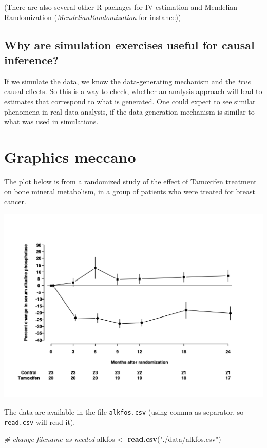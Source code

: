 \documentclass[
]{book}
\newenvironment{Shaded}{\begin{snugshade}}{\end{snugshade}}
\newcommand{\CommentTok}[1]{\textcolor[rgb]{0.56,0.35,0.01}{\textit{#1}}}
\newcommand{\FunctionTok}[1]{\textcolor[rgb]{0.13,0.29,0.53}{\textbf{#1}}}
\newcommand{\NormalTok}[1]{#1}
\newcommand{\OtherTok}[1]{\textcolor[rgb]{0.56,0.35,0.01}{#1}}
\newcommand{\StringTok}[1]{\textcolor[rgb]{0.31,0.60,0.02}{#1}}
\begin{document}
(There are also several other R packages for IV estimation and Mendelian Randomization (\emph{MendelianRandomization} for instance))

\section{Why are simulation exercises useful for causal inference?}\label{why-are-simulation-exercises-useful-for-causal-inference}

If we simulate the data, we know the data-generating mechanism and the \emph{true} causal effects. So this is a way to check, whether
an analysis approach will lead to estimates that correspond to what is generated. One could expect to see similar phenomena in real
data analysis, if the data-generation mechanism is similar to what was used in simulations.

\chapter{Graphics meccano}\label{graphics-meccano}

The plot below is from a randomized study of the effect of
Tamoxifen treatment on bone mineral metabolism, in a group of
patients who were treated for breast cancer.

\includegraphics{./graph/bentK.png}

The data are available in the file \texttt{alkfos.csv} (using comma as
separator, so \texttt{read.csv} will read it).

\begin{Shaded}
\begin{Highlighting}[]
\CommentTok{\# change filename as needed}
\NormalTok{alkfos }\OtherTok{\textless{}{-}} \FunctionTok{read.csv}\NormalTok{(}\StringTok{"./data/alkfos.csv"}\NormalTok{) }
\end{Highlighting}
\end{Shaded}
\end{document}
